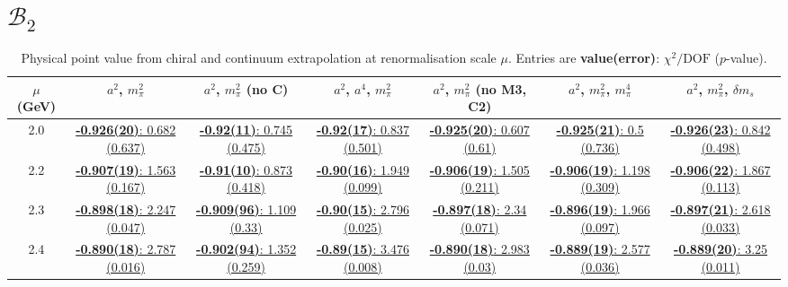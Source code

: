 \documentclass[12pt]{extarticle}
\begin{document}
\section{$\mathcal{B}_2$}
\begin{table}[h!]
\begin{center}
\begin{tabular}{|c|c|c|c|c|c|c|}
\hline
$\mu$ (GeV) & $a^2$, $m_\pi^2$& $a^2$, $m_\pi^2$ (no C)& $a^2$, $a^4$, $m_\pi^2$& $a^2$, $m_\pi^2$ (no M3, C2)& $a^2$, $m_\pi^2$, $m_\pi^4$& $a^2$, $m_\pi^2$, $\delta m_s$\\
\hline
2.0& \hyperlink{VVmAA/SUSY/a2m2_20.pdf.1}{\textbf{-0.926(20)}: 0.682 (0.637)} & \hyperlink{VVmAA/SUSY/a2m2noC_20.pdf.1}{\textbf{-0.92(11)}: 0.745 (0.475)} & \hyperlink{VVmAA/SUSY/a2a4m2_20.pdf.1}{\textbf{-0.92(17)}: 0.837 (0.501)} & \hyperlink{VVmAA/SUSY/a2m2mcut_20.pdf.1}{\textbf{-0.925(20)}: 0.607 (0.61)} & \hyperlink{VVmAA/SUSY/a2m2m4_20.pdf.1}{\textbf{-0.925(21)}: 0.5 (0.736)} & \hyperlink{VVmAA/SUSY/a2m2delm_20.pdf.1}{\textbf{-0.926(23)}: 0.842 (0.498)}\\
2.2& \hyperlink{VVmAA/SUSY/a2m2_22.pdf.1}{\textbf{-0.907(19)}: 1.563 (0.167)} & \hyperlink{VVmAA/SUSY/a2m2noC_22.pdf.1}{\textbf{-0.91(10)}: 0.873 (0.418)} & \hyperlink{VVmAA/SUSY/a2a4m2_22.pdf.1}{\textbf{-0.90(16)}: 1.949 (0.099)} & \hyperlink{VVmAA/SUSY/a2m2mcut_22.pdf.1}{\textbf{-0.906(19)}: 1.505 (0.211)} & \hyperlink{VVmAA/SUSY/a2m2m4_22.pdf.1}{\textbf{-0.906(19)}: 1.198 (0.309)} & \hyperlink{VVmAA/SUSY/a2m2delm_22.pdf.1}{\textbf{-0.906(22)}: 1.867 (0.113)}\\
2.3& \hyperlink{VVmAA/SUSY/a2m2_23.pdf.1}{\textbf{-0.898(18)}: 2.247 (0.047)} & \hyperlink{VVmAA/SUSY/a2m2noC_23.pdf.1}{\textbf{-0.909(96)}: 1.109 (0.33)} & \hyperlink{VVmAA/SUSY/a2a4m2_23.pdf.1}{\textbf{-0.90(15)}: 2.796 (0.025)} & \hyperlink{VVmAA/SUSY/a2m2mcut_23.pdf.1}{\textbf{-0.897(18)}: 2.34 (0.071)} & \hyperlink{VVmAA/SUSY/a2m2m4_23.pdf.1}{\textbf{-0.896(19)}: 1.966 (0.097)} & \hyperlink{VVmAA/SUSY/a2m2delm_23.pdf.1}{\textbf{-0.897(21)}: 2.618 (0.033)}\\
2.4& \hyperlink{VVmAA/SUSY/a2m2_24.pdf.1}{\textbf{-0.890(18)}: 2.787 (0.016)} & \hyperlink{VVmAA/SUSY/a2m2noC_24.pdf.1}{\textbf{-0.902(94)}: 1.352 (0.259)} & \hyperlink{VVmAA/SUSY/a2a4m2_24.pdf.1}{\textbf{-0.89(15)}: 3.476 (0.008)} & \hyperlink{VVmAA/SUSY/a2m2mcut_24.pdf.1}{\textbf{-0.890(18)}: 2.983 (0.03)} & \hyperlink{VVmAA/SUSY/a2m2m4_24.pdf.1}{\textbf{-0.889(19)}: 2.577 (0.036)} & \hyperlink{VVmAA/SUSY/a2m2delm_24.pdf.1}{\textbf{-0.889(20)}: 3.25 (0.011)}\\
\hline
\end{tabular}
\caption{Physical point value from chiral and continuum extrapolation at renormalisation scale $\mu$. Entries are \textbf{value(error)}: $\chi^2/\text{DOF}$ ($p$-value).}
\end{center}
\end{table}
\end{document}
